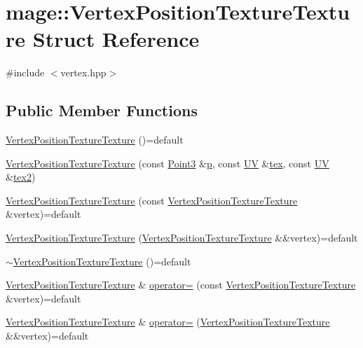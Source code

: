 \hypertarget{structmage_1_1_vertex_position_texture_texture}{}\section{mage\+:\+:Vertex\+Position\+Texture\+Texture Struct Reference}
\label{structmage_1_1_vertex_position_texture_texture}


{\ttfamily \#include $<$vertex.\+hpp$>$}

\subsection*{Public Member Functions}
\begin{DoxyCompactItemize}
\item 
\hyperlink{structmage_1_1_vertex_position_texture_texture_a4dd987362b64d278569f9bd043e2cb8b}{Vertex\+Position\+Texture\+Texture} ()=default
\item 
\hyperlink{structmage_1_1_vertex_position_texture_texture_ad96c9fb6a486b92aeeccb8e7e3da2a3a}{Vertex\+Position\+Texture\+Texture} (const \hyperlink{structmage_1_1_point3}{Point3} \&\hyperlink{structmage_1_1_vertex_position_texture_texture_aed106149eda65a20e60ebc3b93535270}{p}, const \hyperlink{structmage_1_1_u_v}{UV} \&\hyperlink{structmage_1_1_vertex_position_texture_texture_ae47656414d503a2c96c88fa6d485cccf}{tex}, const \hyperlink{structmage_1_1_u_v}{UV} \&\hyperlink{structmage_1_1_vertex_position_texture_texture_a5a41669f18385d932c1490ff20c80bed}{tex2})
\item 
\hyperlink{structmage_1_1_vertex_position_texture_texture_a753bdeb0b5b4ea7fff5bdd4ae21a0c16}{Vertex\+Position\+Texture\+Texture} (const \hyperlink{structmage_1_1_vertex_position_texture_texture}{Vertex\+Position\+Texture\+Texture} \&vertex)=default
\item 
\hyperlink{structmage_1_1_vertex_position_texture_texture_abd23d266932ec6f8c830b804a25a1fe5}{Vertex\+Position\+Texture\+Texture} (\hyperlink{structmage_1_1_vertex_position_texture_texture}{Vertex\+Position\+Texture\+Texture} \&\&vertex)=default
\item 
\hyperlink{structmage_1_1_vertex_position_texture_texture_a861ed56f084a3385429eae5783178529}{$\sim$\+Vertex\+Position\+Texture\+Texture} ()=default
\item 
\hyperlink{structmage_1_1_vertex_position_texture_texture}{Vertex\+Position\+Texture\+Texture} \& \hyperlink{structmage_1_1_vertex_position_texture_texture_a6880fca48f99b6a3360a41f05ca7f9fc}{operator=} (const \hyperlink{structmage_1_1_vertex_position_texture_texture}{Vertex\+Position\+Texture\+Texture} \&vertex)=default
\item 
\hyperlink{structmage_1_1_vertex_position_texture_texture}{Vertex\+Position\+Texture\+Texture} \& \hyperlink{structmage_1_1_vertex_position_texture_texture_a4e6539fcab28def222ec66a3162b8cd9}{operator=} (\hyperlink{structmage_1_1_vertex_position_texture_texture}{Vertex\+Position\+Texture\+Texture} \&\&vertex)=default
\end{DoxyCompactItemize}
